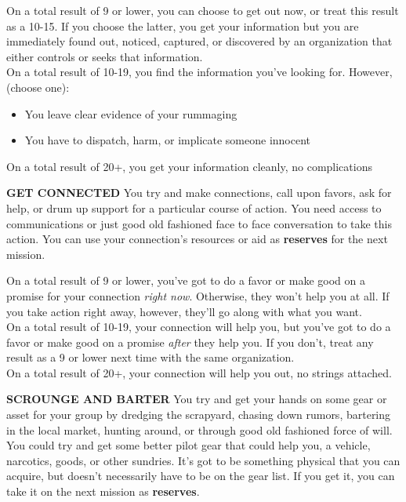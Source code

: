 On a total result of 9 or lower, you can choose to get out now, or treat this result as a 10-15. If you choose the latter, you get your information but you are immediately found out, noticed, captured, or discovered by an organization that either controls or seeks that information.\\
On a total result of 10-19, you find the information you’ve looking for. However, (choose one):
\begin{itemize}
\item You leave clear evidence of your rummaging
\item You have to dispatch, harm, or implicate someone innocent
\end{itemize}  
On a total result of 20+, you get your information cleanly, no complications

\textbf{GET CONNECTED}
You try and make connections, call upon favors, ask for help, or drum up support for a particular course of action. You need access to communications or just good old fashioned face to face conversation to take this action. You can use your connection’s resources or aid as \textbf{reserves} for the next mission.

On a total result of 9 or lower, you’ve got to do a favor or make good on a promise for your connection \textit{right now}. Otherwise, they won’t help you at all. If you take action right away, however, they’ll go along with what you want.\\
On a total result of 10-19, your connection will help you, but you’ve got to do a favor or make good on a promise \textit{after} they help you. If you don’t, treat any result as a 9 or lower next time with the same organization.\\
On a total result of 20+, your connection will help you out, no strings attached.

\textbf{SCROUNGE AND BARTER}
You try and get your hands on some gear or asset for your group by dredging the scrapyard, chasing down rumors, bartering in the local market, hunting around, or through good old fashioned force of will. You could try and get some better pilot gear that could help you, a vehicle, narcotics, goods, or other sundries. It’s got to be something physical that you can acquire, but doesn’t necessarily have to be on the gear list. If you get it, you can take it on the next mission as \textbf{reserves}.

